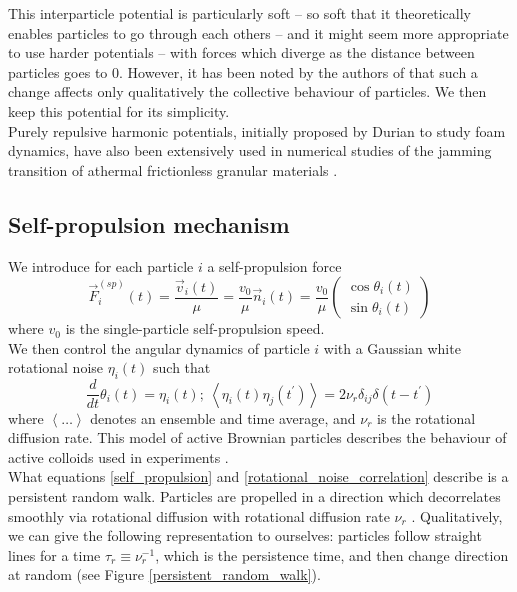 \documentclass[class=report, float=false, crop=false]{standalone}
\begin{document}
This interparticle potential is particularly soft -- so soft that it theoretically enables particles to go through each others -- and it might seem more appropriate to use harder potentials -- with forces which diverge as the distance between particles goes to 0. However, it has been noted by the authors of \cite{fily2014freezing} that such a change affects only qualitatively the collective behaviour of particles. We then keep this potential for its simplicity.\\

Purely repulsive harmonic potentials, initially proposed by Durian \cite{durian1995foam} to study foam dynamics, have also been extensively used in numerical studies of the jamming transition of athermal frictionless granular materials \cite{o2003jamming, olsson2007critical}.

\subsection{Self-propulsion mechanism}
\label{subsection:self_propulsion_mechanism}

We introduce for each particle $i$ a self-propulsion force
\begin{equation}
\vec{F}^{(sp)}_i(t) = \frac{\vec{v}_i(t)}{\mu} = \frac{v_0}{\mu}\vec{n}_i(t) = \frac{v_0}{\mu}\begin{pmatrix}\cos\theta_i(t)\\\sin\theta_i(t)\end{pmatrix}
\label{self_propulsion}
\end{equation}
where $v_0$ is the single-particle self-propulsion speed.\\

We then control the angular dynamics of particle $i$ with a Gaussian white rotational noise $\eta_i(t)$ such that
\begin{equation}
\frac{d}{dt}\theta_i(t) = \eta_i(t);~ \left<\eta_i(t)\eta_j(t^{\prime})\right> = 2\nu_r\delta_{ij}\delta(t - t^{\prime})
\label{rotational_noise_correlation}
\end{equation}
where $\left<\ldots\right>$ denotes an ensemble and time average, and $\nu_r$ is the rotational diffusion rate. This model of active Brownian particles \cite{romanczuk2012active} describes the behaviour of active colloids used in experiments \cite{buttinoni2013dynamical, howse2007self, bialke2015active, theurkauff2012dynamic}.\\

What equations \ref{self_propulsion} and \ref{rotational_noise_correlation} describe is a persistent random walk. Particles are propelled in a direction which decorrelates smoothly via rotational diffusion with rotational diffusion rate $\nu_r$ \cite{cates2015motility}. Qualitatively, we can give the following representation to ourselves: particles follow straight lines for a time $\tau_r \equiv \nu_r^{-1}$, which is the persistence time, and then change direction at random (see Figure \ref{persistent_random_walk}).\\
\end{document}
